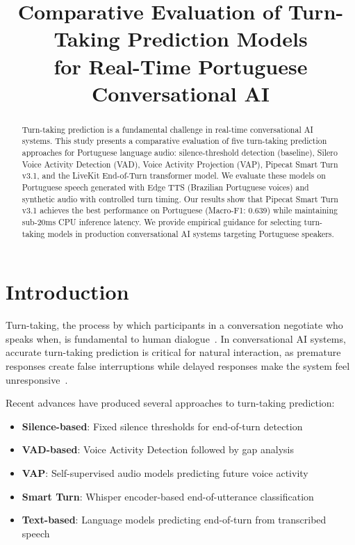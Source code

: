 \documentclass[conference]{IEEEtran}
\title{Comparative Evaluation of Turn-Taking Prediction Models\\for Real-Time Portuguese Conversational AI}
\author{
\IEEEauthorblockN{BabelCast Research}
}
\begin{document}
\maketitle

\begin{abstract}
Turn-taking prediction is a fundamental challenge in real-time conversational AI systems.
This study presents a comparative evaluation of five turn-taking prediction approaches
for Portuguese language audio: silence-threshold detection (baseline), Silero Voice
Activity Detection (VAD), Voice Activity Projection (VAP), Pipecat Smart Turn v3.1,
and the LiveKit End-of-Turn transformer model. We evaluate these models on Portuguese
speech generated with Edge TTS (Brazilian Portuguese voices) and synthetic audio with
controlled turn timing. Our results show that Pipecat Smart Turn v3.1 achieves the
best performance on Portuguese (Macro-F1: 0.639) while maintaining sub-20ms CPU
inference latency. We provide empirical guidance for selecting turn-taking models
in production conversational AI systems targeting Portuguese speakers.
\end{abstract}

\section{Introduction}

Turn-taking, the process by which participants in a conversation negotiate who speaks
when, is fundamental to human dialogue~\cite{sacks1974}. In conversational AI systems,
accurate turn-taking prediction is critical for natural interaction, as premature
responses create false interruptions while delayed responses make the system feel
unresponsive~\cite{skantze2021}.

Recent advances have produced several approaches to turn-taking prediction:
\begin{itemize}
    \item \textbf{Silence-based}: Fixed silence thresholds for end-of-turn detection~\cite{raux2009}
    \item \textbf{VAD-based}: Voice Activity Detection followed by gap analysis
    \item \textbf{VAP}: Self-supervised audio models predicting future voice activity~\cite{ekstedt2024vap}
    \item \textbf{Smart Turn}: Whisper encoder-based end-of-utterance classification~\cite{pipecat2025}
    \item \textbf{Text-based}: Language models predicting end-of-turn from transcribed speech~\cite{livekit2025}
\end{itemize}
\end{document}
